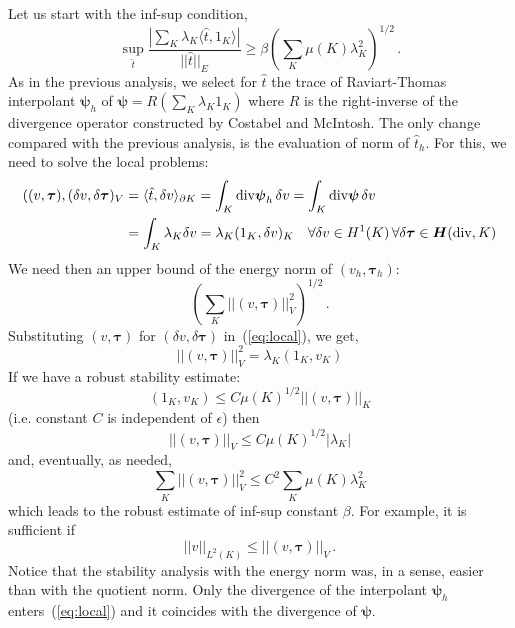 \documentclass[letterpaper]{article}
\def\bftau{\boldsymbol\tau}
\newcommand{\LRp}[1]{\left( #1 \right)}
\newcommand{\ptl}{{\partial}}
\newcommand{\bfpsi}{\boldsymbol\psi}
\newcommand{\bfH}{\mbox{\boldmath $H$}}
\begin{document}
Let us start with the inf-sup condition,
\begin{equation}
\sup_{\hat{t}} \frac{| \sum_K \lambda_K \langle \hat{t},1_K \rangle |}{|| \hat{t} ||_E}
\geq  \beta \LRp{\sum_K \mu(K) \lambda_K^2}^{1/2}\,.
\end{equation}
As in the previous analysis, we select for $\hat{t}$ the trace of Raviart-Thomas
interpolant $\bfpsi_h$ of $\bfpsi = R (\sum_K \lambda_K 1_K)$ where $R$ is the right-inverse
of the divergence operator constructed by Costabel and McIntosh. The only change compared
with the previous analysis, is the evaluation of norm of $\hat{t}_h$. For this, we need
to solve the local problems:
\begin{align}
((v,\bftau), (\delta v, \delta \bftau)_V &= \langle \hat{t}, \delta v \rangle_{\ptl K}
= \int_K \text{div} \bfpsi_h \, \delta v = \int_K \text{div} \bfpsi \, \delta v
\nonumber\\
&= \int_K \lambda_K \delta v
= \lambda_K (1_K,\delta v)_K  \quad \forall \delta v \in
H^1(K)\,\forall\delta\bftau\in\bfH(\text{div},K)
\label{eq:local}
\end{align}
We need then an upper bound of the energy norm of $(v_h,\bftau_h)$:
$$
\LRp{\sum_K || (v,\bftau) ||_V^2}^{1/2}\,.
$$
Substituting $(v,\bftau)$ for $(\delta v,\delta\bftau)$ in~(\ref{eq:local}), we get,
\begin{equation}
|| (v,\bftau) ||_V^2 = \lambda_K (1_K, v_K)
\end{equation}
If we have a robust stability estimate:
\begin{equation}
(1_K, v_K) \leq C \mu(K)^{1/2} || (v,\bftau) ||_K
\label{eq:robustEst1}
\end{equation}
(i.e. constant $C$ is independent of $\epsilon$) then
\begin{equation}
||  (v,\bftau) ||_V \leq C \mu(K)^{1/2} | \lambda_K |
\end{equation}
and, eventually, as needed,
\begin{equation}
\sum_K || (v,\bftau) ||_V^2  \leq C^2 \sum_K \mu(K) \lambda_K^2
\end{equation}
which leads to the robust estimate of inf-sup constant $\beta$. For example, it is sufficient if
\begin{equation}
|| v ||_{L^2(K)} \leq || (v,\bftau) ||_V \, .
\label{eq:robust_est1}
\end{equation}
Notice that the stability analysis with the energy norm was, in a sense, easier than
with the quotient norm. Only the divergence of the interpolant $\bfpsi_h$ enters~(\ref{eq:local})
and it coincides with the divergence of $\bfpsi$.
\end{document}
